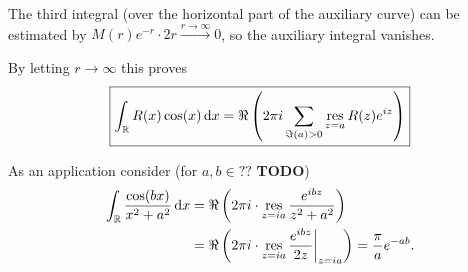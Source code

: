 \documentclass[a4paper,english]{article}
\begin{document}
\begin{exampleB}[TODO]
    The third integral (over the horizontal part of the auxiliary curve) can be estimated by $M(r) e^{-r} \cdot 2 r \xrightarrow{r \to \infty} 0$, so the auxiliary integral vanishes.
    
    By letting $r \to \infty$ this proves
    \begin{equation*}
        \boxed{\int_{\operatorname{\mathbb{R}}} R(x) \cos(x) \mathop{}\!\mathrm{d}{x}
        = \Re\left( 2 \pi i \sum_{\Im(a) > 0} \operatorname*{res}_{z = a} R(z) e^{i z}\right)}
    \end{equation*}
    
    As an application consider (for $a,b \in ??$ \textbf{TODO})
    \begin{align*}
        \int_{\operatorname{\mathbb{R}}} \frac{\cos(b x)}{x^2 + a^2} \mathop{}\!\mathrm{d}{x}
        & = \Re\left( 2 \pi i \cdot \operatorname*{res}_{z = i a} \frac{e^{i b z}}{z^2 + a^2}\right) \\
        & = \Re\left( 2 \pi i \cdot \operatorname*{res}_{z = i a} \frac{e^{i b z}}{2 z} \bigg|_{z = i a}\right)
        = \frac{\pi}{a} e^{- a b}.
    \end{align*}
\end{exampleB}
\end{document}
